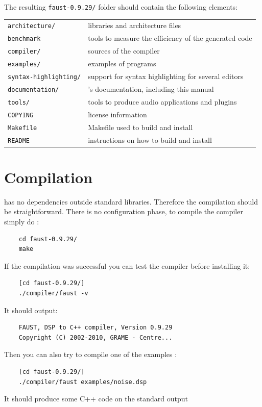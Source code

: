\documentclass[a4paper,10pt]{book}
\begin{document}
The resulting  \lstinline'faust-0.9.29/' folder should contain the following elements:

\begin{tabular}{ll}
	\lstinline'architecture/' 		&\faust libraries and architecture files\\
	\lstinline'benchmark'			&tools to measure the efficiency of the generated code\\
	\lstinline'compiler/'			&sources of the \faust compiler\\
	\lstinline'examples/'			&examples of \faust programs\\
	\lstinline'syntax-highlighting/'&	support for syntax highlighting for several editors\\
	\lstinline'documentation/' 		&\faust's documentation, including this manual\\
	\lstinline'tools/'				&tools to produce audio applications and plugins\\
	\lstinline'COPYING'				&license information\\
	\lstinline'Makefile'			&Makefile used to build and install \faust\\
	\lstinline'README'				&instructions on how to build and install \faust
\end{tabular}

\section{Compilation}
\faust has no dependencies outside standard libraries. Therefore the compilation should be straightforward. There is no configuration phase, to compile the \faust compiler simply do :
\begin{lstlisting}
	cd faust-0.9.29/
	make
\end{lstlisting}

If the compilation was successful you can test the compiler before installing it:
\begin{lstlisting}
	[cd faust-0.9.29/]
	./compiler/faust -v
\end{lstlisting}
It should output:
\begin{lstlisting}
	FAUST, DSP to C++ compiler, Version 0.9.29
	Copyright (C) 2002-2010, GRAME - Centre... 
\end{lstlisting}

Then you can also try to compile one of the examples :
\begin{lstlisting}
	[cd faust-0.9.29/]
	./compiler/faust examples/noise.dsp
\end{lstlisting}
It should produce some C++ code on the standard output
\end{document}
